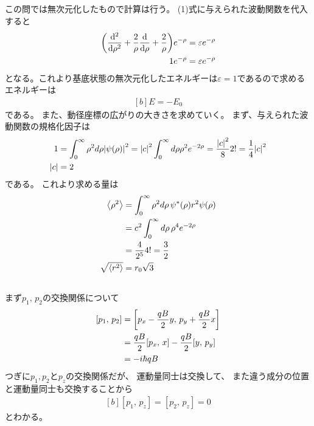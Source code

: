 \documentclass[../../sp_2013.tex]{subfiles}
\begin{document}
\subsection{}
この問では無次元化したもので計算は行う。
(1)式に与えられた波動関数を代入すると
\begin{equation}\begin{aligned}[b]
    \qty(\dv[2]{\rho}+\frac{2}{\rho}\dv{\rho}+\frac{2}{\rho})e^{-\rho} &= \varepsilon e^{-\rho}\\
    1e^{-\rho} &= \varepsilon e^{-\rho}
\end{aligned}\end{equation}
となる。これより基底状態の無次元化したエネルギーは\(\varepsilon = 1\)であるので求めるエネルギーは
\begin{equation}\begin{aligned}[b]
    E = -E_0
\end{aligned}\end{equation}
である。
また、動径座標の広がりの大きさを求めていく。
まず、与えられた波動関数の規格化因子は
\begin{equation}\begin{aligned}[b]
    1 &= \int_{0}^{\infty} \rho^2 d\rho \abs{\psi(\rho)}^2
        = \abs{c}^2\int_{0}^{\infty} d\rho \rho^2 e^{-2\rho} =\frac{\abs{c}^2}{8} 2! = \frac{1}{4}\abs{c}^2\\
    \abs{c} &= 2
\end{aligned}\end{equation}
である。
これより求める量は
\begin{equation}\begin{aligned}[b]
    \ev{\rho^2}
    &= \int_{0}^{\infty} \rho^2 d\rho\, \psi^*(\rho)r^2\psi(\rho)\\
    &= c^2 \int_{0}^{\infty} d\rho\, \rho^4 e^{-2\rho}\\
    &= \frac{4}{2^5}4! = \frac{3}{2}\\
    \sqrt{\ev{r^2}} &= r_0\sqrt{3}
\end{aligned}\end{equation}

\subsection{}
まず\(p_1,\,p_2\)の交換関係について
\begin{equation}\begin{aligned}[b]
    [p_1,\,p_2]&= \qty[p_x-\frac{qB}{2}y,\,p_y+\frac{qB}{2}x]\\
    &=\frac{qB}{2}[p_x,\,x]-\frac{qB}{2}[y,\,p_y]\\
    &= -i\hbar qB
\end{aligned}\end{equation}
つぎに\(p_1,p_2\)と\(p_z\)の交換関係だが、
運動量同士は交換して、
また違う成分の位置と運動量同士も交換することから
\begin{equation}\begin{aligned}[b]
    [p_1,\,p_z] = [p_2,\,p_z] = 0
\end{aligned}\end{equation}
とわかる。
\end{document}
